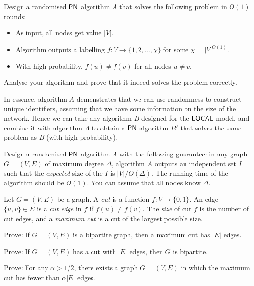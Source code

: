 \begin{ex}
    Design a randomised $\textup{\sffamily PN}$ algorithm $A$ that solves the following problem in $O(1)$ rounds:
    \begin{itemize}[noitemsep]
        \item As input, all nodes get value $|V|$.
        \item Algorithm outputs a labelling $f\colon V \to \{1,2,\dotsc,\chi\}$ for some $\chi = |V|^{O(1)}$.
        \item With high probability, $f(u) \ne f(v)$ for all nodes $u \ne v$.
    \end{itemize}
    Analyse your algorithm and prove that it indeed solves the problem correctly.

    In essence, algorithm $A$ demonstrates that we can use randomness to construct unique identifiers, assuming that we have some information on the size of the network. Hence we can take any algorithm $B$ designed for the $\textup{\sffamily LOCAL}$ model, and combine it with algorithm $A$ to obtain a $\textup{\sffamily PN}$ algorithm $B'$ that solves the same problem as $B$ (with high probability).
\end{ex}

\begin{ex}
    Design a randomised $\textup{\sffamily PN}$ algorithm $A$ with the following guarantee: in any graph $G = (V,E)$ of maximum degree $\Delta$, algorithm $A$ outputs an independent set $I$ such that the \emph{expected} size of the $I$ is $|V|/O(\Delta)$. The running time of the algorithm should be $O(1)$. You can assume that all nodes know $\Delta$.
\end{ex}

\begin{ex}
    Let $G = (V,E)$ be a graph. A \emph{cut} is a function $f\colon V \to \{0,1\}$. An edge $\{u,v\} \in E$ is a \emph{cut edge} in $f$ if $f(u) \ne f(v)$. The \emph{size} of cut $f$ is the number of cut edges, and a \emph{maximum cut} is a cut of the largest possible size.
    \begin{subex}
        \item Prove: If $G = (V,E)$ is a bipartite graph, then a maximum cut has $|E|$ edges.
        \item Prove: If $G = (V,E)$ has a cut with $|E|$ edges, then $G$ is bipartite.
        \item Prove: For any $\alpha > 1/2$, there exists a graph $G = (V,E)$ in which the maximum cut has fewer than $\alpha |E|$ edges.
    \end{subex}
\end{ex}

